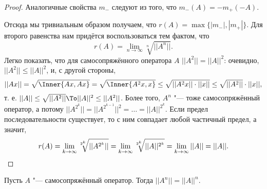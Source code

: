 \documentclass[main]{subfiles}
\begin{document}
\begin{proof}
  Аналогичные свойства \( m_- \) следуют из того,
  что \( m_-(A) = -m_+(-A) \).

  Отсюда мы тривиальным образом получаем,
  что \( r(A) = \max \{ |m_-|, |m_+| \} \).
  Для второго равенства нам придётся воспользоваться
  тем фактом, что
  \[
    r(A) = \lim_{n\to\infty} \sqrt[n]{||A^n||}.
  \]
  Легко показать, что
  для самосопряжённого оператора \( A \)
  \( ||A^2|| = ||A||^2 \):
  очевидно, \( ||A^2|| \le ||A||^2 \),
  и, с другой стороны,
  \[
    ||A x|| = \sqrt{\Inner{Ax, Ax}} =
    \sqrt{\Inner{A^2 x, x}} \le
    \sqrt{||A^2 x|| \cdot ||x||} \le
    \sqrt{||A^2||} \cdot ||x||,
  \]
  т. е. \( ||A|| \le \sqrt{||A^2||} \To
  ||A||^2 \le ||A^2|| \).
  Более того, \( A^n \) "--- тоже самосопряжённый
  оператор, а потому
  \( ||A^{2^k}|| = ||A^{2^{k-1}}||^2 = \dots =
  ||A||^{2^k} \).
  Если предел последовательности существует,
  то с ним совпадает любой частичный предел,
  а значит,
  \[
    r(A) = \lim_{k \to \infty} \sqrt[2^k]{||A^{2^k}||} =
    \lim_{k \to \infty} \sqrt[2^k]{||A||^{2^k}} =
    \lim_{k \to \infty} ||A|| = ||A||. \qedhere
  \]
\end{proof}

\begin{exercise}
  Пусть \( A \) "--- самосопряжённый оператор.
  Тогда
  \( ||A^n|| = ||A||^n \).
\end{exercise}
\end{document}
